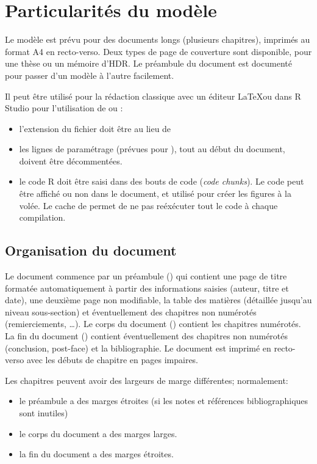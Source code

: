 \documentclass[
  a4paper, %
  11pt, extrafontsizes, %
  onecolumn, %
  openright, %
]{memoir}
\begin{document}
\section{Particularités du modèle}

Le modèle est prévu pour des documents longs (plusieurs chapitres), imprimés au format A4 en recto-verso.
Deux types de page de couverture sont disponible, pour une thèse ou un mémoire d'HDR. Le préambule du document est documenté pour passer d'un modèle à l'autre facilement. 

Il peut être utilisé pour la rédaction classique avec un éditeur \LaTeX ou dans R Studio pour l'utilisation de  ou :
\begin{itemize}
  \item l'extension du fichier doit être  au lieu de 
  \item les lignes de paramétrage (prévues pour ), tout au début du document, doivent être décommentées.
  \item le code R doit être saisi dans des bouts de code (\emph{\foreignlanguage{english}{code chunks}}). Le code peut être affiché ou non dans le document, et utilisé pour créer les figures à la volée. Le cache de  permet de ne pas reéxécuter tout le code à chaque compilation.
\end{itemize}


\subsection{Organisation du document}

Le document commence par un préambule () qui contient une page de titre formatée automatiquement à partir des informations saisies (auteur, titre et date), une deuxième page non modifiable, la table des matières (détaillée jusqu'au niveau sous-section) et éventuellement des chapitres non numérotés (remierciements, \dots). 
Le corps du document () contient les chapitres numérotés. 
La fin du document () contient éventuellement des chapitres non numérotés (conclusion, post-face) et la bibliographie. 
Le document est imprimé en recto-verso avec les débuts de chapitre en pages impaires.

Les chapitres peuvent avoir des largeurs de marge différentes; normalement:
\begin{itemize}
  \item le préambule a des marges étroites (si les notes et références bibliographiques sont inutiles)
  \item le corps du document a des marges larges.
  \item la fin du document a des marges étroites.
\end{itemize}
\end{document}
